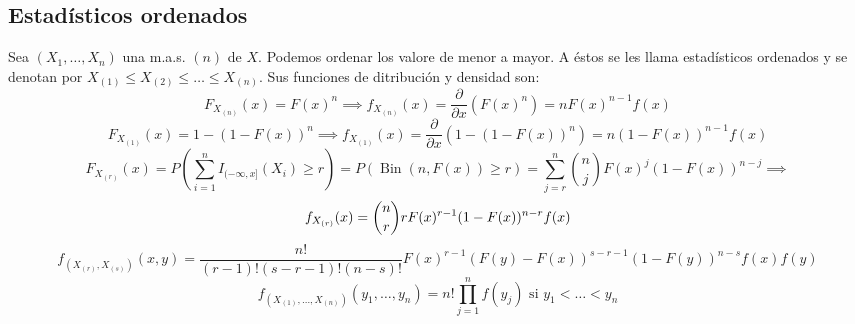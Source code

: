 \subsection{Estadísticos ordenados}
\begin{definición}
Sea $\left(X_{1}, \ldots, X_{n}\right)$ una m.a.s. $(n)$ de $X$. Podemos ordenar los valore de menor a mayor. A éstos se les llama estadísticos ordenados y se denotan por $X_{(1)} \leq X_{(2)} \leq \ldots \leq X_{(n)}$.
Sus funciones de ditribución y densidad son:
$$F_{X_{(n)}}(x)=F(x)^{n} \implies f_{X_{(n)}}(x)= \frac{\partial}{\partial{x}}(F(x)^n) = n F(x)^{n-1} f(x)$$
$$F_{X_{(1)}}(x)=1-(1-F(x))^{n} \implies f_{X_{(1)}}(x)= \frac{\partial}{\partial{x}}(1-(1-F(x))^n) = n(1-F(x))^{n-1} f(x)$$
$$F_{X_{(r)}}(x) = P\left(\sum_{i=1}^{n} I_{(-\infty, x]}(X_i) \geq r\right) = P(\operatorname{Bin}(n, F(x)) \geq r) = \sum_{j=r}^{n} \binom{n}{j} F(x)^j(1-F(x))^{n-j} \implies$$  $$\\ f_{X_{(r)}}(x) = \binom{n}{r} r F(x)^{r-1}(1-F(x))^{n-r} f(x)$$
$$f_{\left(X_{(r)}, X_{(s)}\right)}(x, y) = \frac{n!}{(r-1)!(s-r-1)!(n-s)!} F(x)^{r-1}(F(y)-F(x))^{s-r-1}(1-F(y))^{n-s} f(x) f(y)$$
$$f_{\left(X_{(1)}, \ldots, X_{(n)}\right)}(y_1, \ldots, y_n) = n! \prod_{j=1}^{n} f(y_j) \text{ si } y_1 < \ldots < y_n$$
\end{definición}

